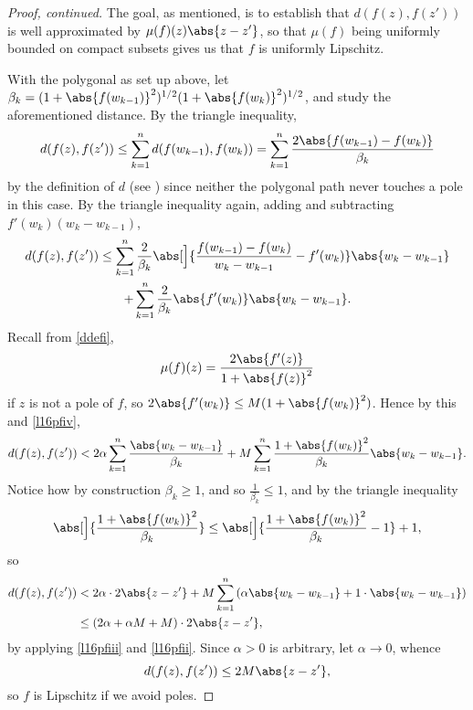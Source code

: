 


\begin{proof}[Proof, continued]
	The goal, as mentioned, is to establish that $d(f(z), f(z'))$ is well approximated by $\mu(f)(z) \abs{z - z'}$, so that $\mu(f)$ being uniformly bounded on compact subsets gives us that $f$ is uniformly Lipschitz.

	With the polygonal as set up above, let $\beta_k = (1 + \abs{f(w_{k - 1})}^2)^{1/2} (1 + \abs{f(w_k)}^2)^{1/2}$, and study the aforementioned distance.
	By the triangle inequality,
	\[
		d(f(z), f(z')) \leq \sum_{k = 1}^n d(f(w_{k - 1}), f(w_k)) = \sum_{k = 1}^n \frac{2 \abs{f(w_{k - 1}) - f(w_k)}}{\beta_k}
	\]
	by the definition of $d$ (see ) since neither the polygonal path never touches a pole in this case.
	By the triangle inequality again, adding and subtracting $f'(w_k) (w_k - w_{k - 1})$,
	\begin{gather*}
		d(f(z), f(z')) \leq \sum_{k = 1}^n \frac{2}{\beta_k} \abs[\Big]{\frac{f(w_{k - 1}) - f(w_k)}{w_k - w_{k - 1}} - f'(w_k)} \abs{w_k - w_{k - 1}} \\ + \sum_{k = 1}^n \frac{2}{\beta_k} \abs{f'(w_k)} \abs{w_k - w_{k - 1}}.
	\end{gather*}
	Recall from \ref{ddefi},
	\[
		\mu(f)(z) = \frac{2 \abs{f'(z)}}{1 + \abs{f(z)}^2}
	\]
	if $z$ is not a pole of $f$, so $2 \abs{f'(w_k)} \leq M(1 + \abs{f(w_k)}^2)$.
	Hence by this and \ref{l16pfiv},
	\[
		d(f(z), f(z')) < 2 \alpha \sum_{k = 1}^n \frac{\abs{w_k - w_{k - 1}}}{\beta_k} + M \sum_{k = 1}^n \frac{1 + \abs{f(w_k)}^2}{\beta_k} \abs{w_k - w_{k - 1}}.
	\]
	Notice how by construction $\beta_k \geq 1$, and so $\frac{1}{\beta_k} \leq 1$, and by the triangle inequality
	\[
		\abs[\Big]{\frac{1 + \abs{f(w_k)}^2}{\beta_k}} \leq \abs[\Big]{\frac{1 + \abs{f(w_k)}^2}{\beta_k} - 1} + 1,
	\]
	so
	\begin{align*}
		d(f(z), f(z')) &< 2 \alpha \cdot 2 \abs{z - z'} + M \sum_{k = 1}^n \left ( \alpha \abs{w_k - w_{k - 1}} + 1 \cdot \abs{w_k - w_{k - 1}} \right ) \\
		&\leq (2 \alpha + \alpha M + M) \cdot 2 \abs{z - z'},
	\end{align*}
	by applying \ref{l16pfiii} and \ref{l16pfii}.
	Since $\alpha > 0$ is arbitrary, let $\alpha \to 0$, whence
	\[
		d(f(z), f(z')) \leq 2 M \abs{z - z'},
	\]
	so $f$ is Lipschitz if we avoid poles.


\end{proof}
